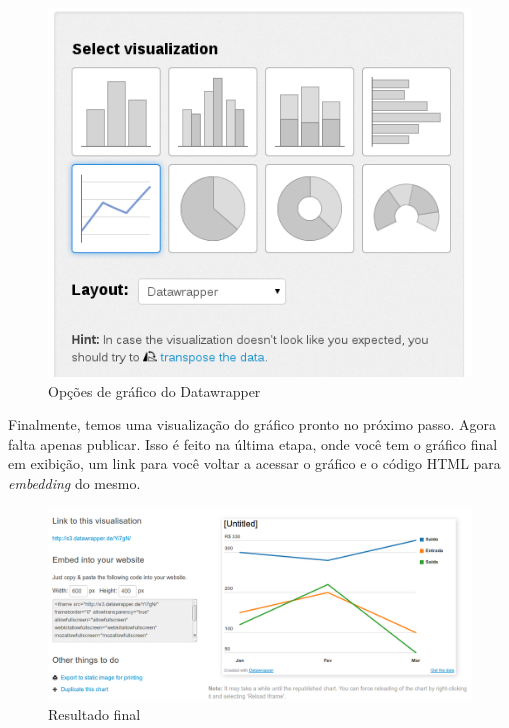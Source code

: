 \documentclass[12pt,onecolumn]{article}
\begin{document}
    \begin{figure}[H]
      \begin{center}
        \includegraphics[scale=0.4]{datawrapper-charts.png}
        \caption{Opções de gráfico do Datawrapper}
        \label{fig:datawrapper-charts}
      \end{center}
    \end{figure}
    
    Finalmente, temos uma visualização do gráfico pronto no próximo passo. Agora
    falta apenas publicar. Isso é feito na última etapa, onde você tem o gráfico
    final em exibição, um link para você voltar a acessar o gráfico e o código
    HTML para \emph{embedding} do mesmo.
    
    \begin{figure}[H]
      \begin{center}
        \includegraphics[width=.9\linewidth]{datawrapper-final.png}
        \caption{Resultado final}
        \label{fig:datawrapper-final}
      \end{center}
    \end{figure}
    
\end{document}
